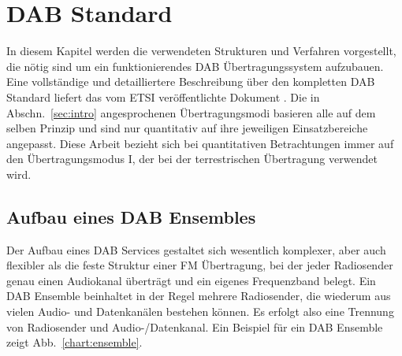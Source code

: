 \chapter{DAB Standard}
In diesem Kapitel werden die verwendeten Strukturen und Verfahren vorgestellt, die nötig sind um ein funktionierendes DAB Übertragungssystem aufzubauen. Eine vollständige und detailliertere Beschreibung über den kompletten DAB Standard liefert das vom \ac{ETSI} veröffentlichte Dokument \cite{etsi:dab_main}. Die in Abschn.~\ref{sec:intro} angesprochenen Übertragungsmodi basieren alle auf dem selben Prinzip und sind nur quantitativ auf ihre jeweiligen Einsatzbereiche angepasst. Diese Arbeit bezieht sich bei quantitativen Betrachtungen immer auf den Übertragungsmodus I, der bei der terrestrischen Übertragung verwendet wird.

\section{Aufbau eines DAB Ensembles}
Der Aufbau eines DAB Services gestaltet sich wesentlich komplexer, aber auch flexibler als die feste Struktur einer FM Übertragung, bei der jeder Radiosender genau einen Audiokanal überträgt und ein eigenes Frequenzband belegt. Ein DAB Ensemble beinhaltet in der Regel mehrere Radiosender, die wiederum aus vielen Audio- und Datenkanälen bestehen können. Es erfolgt also eine Trennung von Radiosender und Audio-/Datenkanal. Ein Beispiel für ein DAB Ensemble zeigt Abb.~\ref{chart:ensemble}.\\

